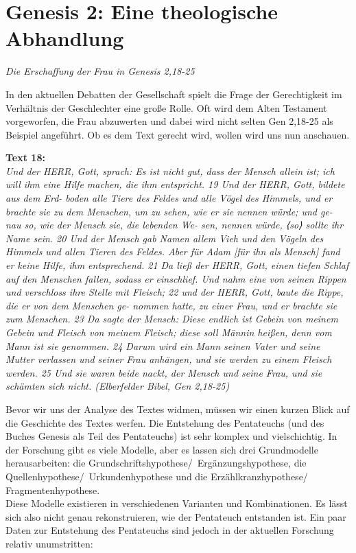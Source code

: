 \section{Genesis 2: Eine theologische Abhandlung}


\begin{center}
\textit{\color{gray}Die Erschaffung der Frau in Genesis 2,18-25}
\end{center}

In den aktuellen Debatten der Gesellschaft spielt die Frage der Gerechtigkeit im Verhältnis der Geschlechter eine große Rolle. Oft wird dem Alten Testament vorgeworfen, die Frau abzuwerten und dabei wird nicht selten Gen 2,18-25 als Beispiel angeführt. Ob es dem Text gerecht wird, wollen wird uns nun anschauen.

\begin{multicols}{2}
\textbf{Text 18:}\\ \textit{Und der HERR, Gott, sprach: Es ist nicht gut, dass der Mensch allein ist; ich will ihm eine Hilfe machen, die ihm entspricht. 19 Und der HERR, Gott, bildete aus dem Erd- boden alle Tiere des Feldes und alle Vögel des Himmels, und er brachte sie zu dem Menschen, um zu sehen, wie er sie nennen würde; und ge- nau so, wie der Mensch sie, die lebenden We- sen, nennen würde, ⟨so⟩ sollte ihr Name sein. 20 Und der Mensch gab Namen allem Vieh und den Vögeln des Himmels und allen Tieren des Feldes. Aber für Adam [für ihn als Mensch] fand er keine Hilfe, ihm entsprechend. 21 Da ließ der HERR, Gott, einen tiefen Schlaf auf den Menschen fallen, sodass er einschlief. Und
 nahm eine von seinen Rippen und verschloss ihre Stelle mit Fleisch; 22 und der HERR, Gott, baute die Rippe, die er von dem Menschen ge- nommen hatte, zu einer Frau, und er brachte sie zum Menschen. 23 Da sagte der Mensch: Diese endlich ist Gebein von meinem Gebein und Fleisch von meinem Fleisch; diese soll Männin heißen, denn vom Mann ist sie genommen. 24 Darum wird ein Mann seinen Vater und seine Mutter verlassen und seiner Frau anhängen, und sie werden zu einem Fleisch werden. 25 Und sie waren beide nackt, der Mensch und seine Frau, und sie schämten sich nicht. (Elberfelder Bibel, Gen 2,18-25)}
\end{multicols}

Bevor wir uns der Analyse des Textes widmen, müssen wir einen kurzen Blick auf die Geschichte des Textes werfen. Die Entstehung des Pentateuchs (und des Buches Genesis als Teil des Pentateuchs) ist sehr komplex und vielschichtig. In der Forschung gibt es viele Modelle, aber es lassen sich drei Grundmodelle herausarbeiten: die Grundschriftshypothese/~Ergänzungshypothese, die Quellenhypothese/~Urkundenhypothese und die Erzählkranzhypothese/ Fragmentenhypothese. \\Diese Modelle existieren in verschiedenen Varianten und Kombinationen. Es lässt sich also nicht genau rekonstruieren, wie der Pentateuch entstanden ist. Ein paar Daten zur Entstehung des Pentateuchs sind jedoch in der aktuellen Forschung relativ unumstritten:


